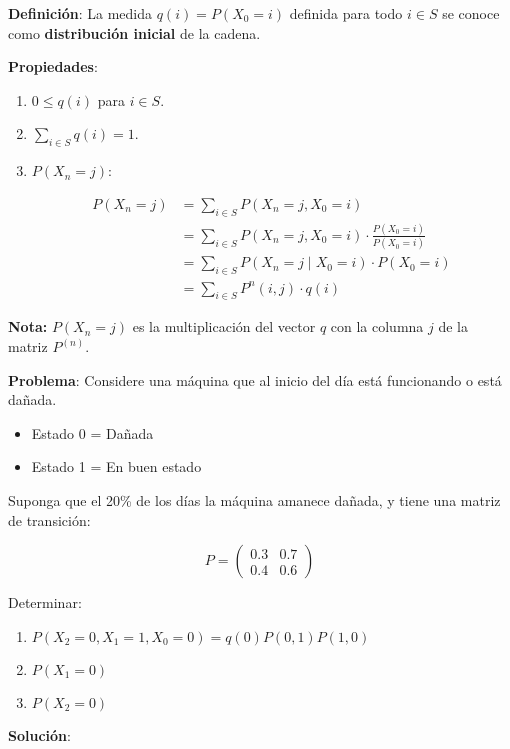 \documentclass[12pt,a4paper]{article}
\newcommand{\definicion}[1]{%
\begin{definicionbox}
\textbf{Definición}: #1
\end{definicionbox}
}
\begin{document}
\definicion{La medida $q(i) = P(X_0 = i)$ definida para todo $i \in S$ se conoce como \textbf{distribución inicial} de la cadena.}

\textbf{Propiedades}:

\begin{enumerate}
    \item $0 \leq q(i)$ para $i \in S$.
    \item $\sum_{i \in S} q(i) = 1$.
    \item $P(X_n = j)$:

    \begin{align*}
    P(X_n = j) &= \sum_{i \in S} P(X_n = j, X_0 = i) \\
    &= \sum_{i \in S} P(X_n = j, X_0 = i) \cdot \frac{P(X_0 = i)}{P(X_0 = i)} \\
    &= \sum_{i \in S} P(X_n = j \mid X_0 = i) \cdot P(X_0 = i) \\
    &= \sum_{i \in S} P^n(i,j) \cdot q(i)
    \end{align*}
\end{enumerate}

\textbf{Nota:} $P(X_n = j)$ es la multiplicación del vector $q$ con la columna $j$ de la matriz $P^{(n)}$.

\textbf{Problema}: Considere una máquina que al inicio del día está funcionando o está dañada.

\begin{itemize}
    \item Estado 0 = Dañada
    \item Estado 1 = En buen estado
\end{itemize}

Suponga que el 20\% de los días la máquina amanece dañada, y tiene una matriz de transición:

\begin{equation*}
P = \begin{pmatrix}
0.3 & 0.7 \\
0.4 & 0.6
\end{pmatrix}
\end{equation*}

Determinar:
\begin{enumerate}
    \item $P(X_2 = 0, X_1 = 1, X_0 = 0) = q(0) P(0,1) P(1,0)$
    \item $P(X_1 = 0)$
    \item $P(X_2 = 0)$
\end{enumerate}

\textbf{Solución}:
\end{document}
